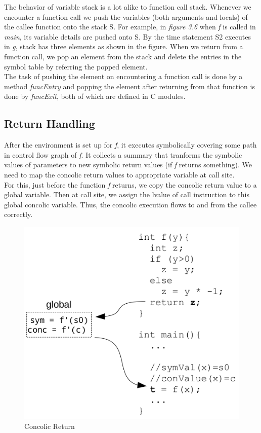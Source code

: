 \documentclass[12pt,oneside]{book}
\begin{document}
The behavior of variable stack is a lot alike to function call stack. Whenever we encounter a function call we push the variables (both arguments and locals) of the callee function onto the stack S. For example, in \textit{figure 3.6} when \textit{f} is called in \textit{main}, its variable details are pushed onto S. By the time statement S2 executes in \textit{g}, stack has three elements as shown in the figure.
When we return from a function call, we pop an element from the stack and delete the entries in the symbol table by referring the popped element.\\
The task of pushing the element on encountering a function call is done by a method \textit{funcEntry} and popping the element after returning from that function is done by \textit{funcExit}, both of which are defined in C modules.

\subsection{Return Handling}
After the environment is set up for \textit{f}, it executes symbolically covering some path in control flow graph of \textit{f}. It collects a summary that tranforms the symbolic values of parameters to new symbolic return values (if \textit{f} returns something). We need to map the concolic return values to appropriate variable at call site.\\ 
For this, just before the function \textit{f} returns, we copy the concolic return value to a global variable. Then at call site, we assign the lvalue of call instruction to this global concolic variable. Thus, the concolic execution flows to and from the callee correctly.   

\vspace{0.3cm}
\begin{figure}[htbp]
\centering
\includegraphics[scale=0.40]{return.png}
\caption{Concolic Return}
\end{figure}
\end{document}
